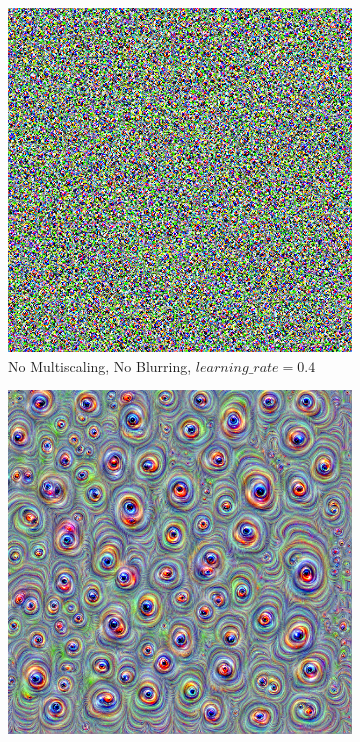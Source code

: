 \begin{figure}
    \captionsetup{justification=centering}

    \begin{subfigure}[t]{0.31\textwidth}
        \captionsetup{justification=centering}
        \centering
        \includegraphics[width=.7\linewidth]{figuras/feat_vis/experiments/layers/intermediary/l8/random_image_pl1_lr4e-1_layer17_no-blur.png}
        \caption{No Multiscaling, No Blurring, \(learning\_rate = 0.4\)}
    \end{subfigure}
    \hfill
    \begin{subfigure}[t]{0.31\textwidth}
        \captionsetup{justification=centering}
        \centering
        \includegraphics[width=.7\linewidth]{figuras/feat_vis/experiments/layers/intermediary/l8/random_image_pl4_lr4e-2_layer17_no-blur.png}

\end{subfigure}
\end{figure}
